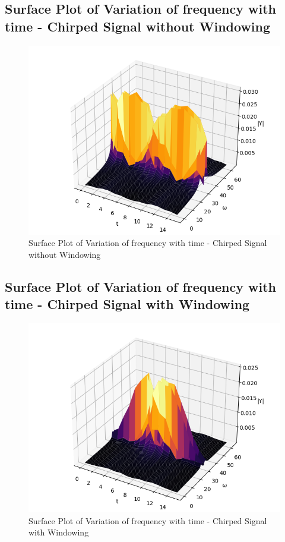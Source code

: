 \documentclass[11pt]{article}
\begin{document}
\subsection{Surface Plot of Variation of frequency with time - Chirped Signal without Windowing}
\begin{figure}[H]
    \centering
    \includegraphics[scale = 0.75]{Figure_11.png}
    \caption{Surface Plot of Variation of frequency with time - Chirped Signal without Windowing}
\end{figure}

\subsection{Surface Plot of Variation of frequency with time - Chirped Signal with Windowing}
\begin{figure}[H]
    \centering
    \includegraphics[scale = 0.75]{Figure_12.png}
    \caption{Surface Plot of Variation of frequency with time - Chirped Signal with Windowing}
\end{figure}
\end{document}
